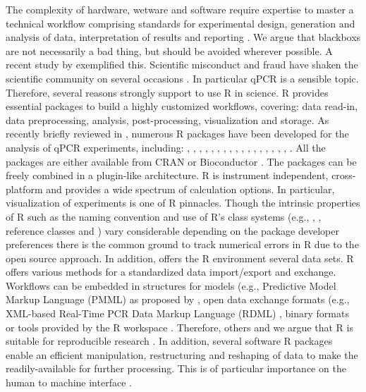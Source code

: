 The complexity of hardware, wetware and software require expertise to master a 
technical workflow comprising standards for experimental design, generation and 
analysis of data, interpretation of results and reporting 
\citep{huggett_BDQ_2014}. We argue that blackboxs are not necessarily a bad 
thing, but should be avoided wherever possible. A recent study by 
\citet{Duran_2014} exemplified this. Scientific misconduct and fraud have shaken 
the scientific community on several occasions \citep{mccullough_2008, 
Almiron_2010, fang_2012}. In particular qPCR is a sensible topic. Therefore, 
several reasons strongly support to use R in science. R provides essential 
packages to build a highly customized workflows, covering: data read-in, data 
preprocessing, analysis, post-processing, visualization and storage. As recently 
briefly reviewed in 
\citet{pabinger_2014}, numerous R packages have been developed for the analysis 
of qPCR experiments, including: , , 
, , , , 
, , , , 
, , , , 
, , , 
. All the packages are either available from CRAN or 
Bioconductor \citep{gentleman_2004}. The packages can be freely combined in a 
plugin-like architecture. R is instrument independent, cross-platform and 
provides a wide spectrum of calculation options. In particular, visualization of 
experiments is one of R pinnacles. Though the intrinsic properties of R such as 
the naming convention \citep{Baaaath_2012} and use of R's class systems (e.g., 
, , reference classes and ) vary considerable 
depending on the package developer preferences there is the common ground to 
track numerical errors in R due to the open source approach. In addition, offers 
the R environment several data sets. R offers various methods for a standardized 
data import/export and exchange. Workflows can be embedded in structures for 
models (e.g., Predictive Model Markup Language (PMML) as proposed by 
\citet{Guazzelli_2009}, open data exchange formats (e.g., XML-based Real-Time 
PCR Data Markup Language (RDML) \citep{lefever_2009}, binary formats 
\citep{michna_2013} or tools provided by the R workspace \citep{RDCT2010c}. 
Therefore, others and we argue that R is suitable for reproducible research 
\citep{Gesmann_2011, Murrell_2012, gandrud_2013, hofmann_2013, Leeper_2014, 
liu_2014}. In addition, several software R packages enable an efficient 
manipulation, restructuring and reshaping of data to make the readily-available 
for further processing. This is of particular importance on the human to machine 
interface \citep{Oh_2014}.


